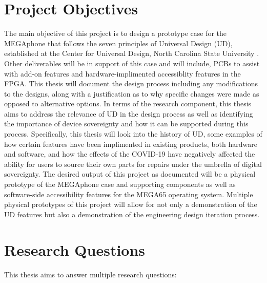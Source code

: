 

\section{Project Objectives}

The main objective of this project is to design a prototype case for the MEGAphone that follows the seven principles of Universal Design (UD), established at the Center for Universal Design, North Carolina State University \cite{sevenprinciples}. 
Other deliverables will be in support of this case and will include, PCBs to assist with add-on features and hardware-implimented accessiblity features in the FPGA.
This thesis will document the design process including any modifications to the designs, along with a justification as to why specific changes were made as opposed to alternative options.
In terms of the research component, this thesis aims to address the relevance of UD in the design process as well as identifying the importance of device sovereignty and how it can be supported during this process.
Specifically, this thesis will look into the history of UD, some examples of how certain features have been implimented in existing products, both hardware and software, and how the effects of the COVID-19 have negatively affected the ability for users to source their own parts for repairs under the umbrella of digital sovereignty.
The desired output of this project as documented will be a physical prototype of the MEGAphone case and supporting components as well as software-side accessibility features for the MEGA65 operating system.
Multiple physical prototypes of this project will allow for not only a demonstration of the UD features but also a demonstration of the engineering design iteration process.
 

\section{Research Questions}

This thesis aims to answer multiple research questions:

